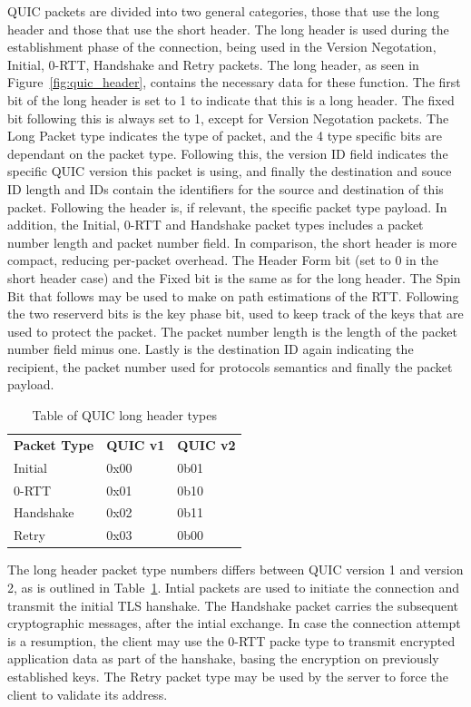 \documentclass[english, 12pt, a4paper, elec, utf8, a-2b, online]{aaltothesis}
\begin{document}
QUIC packets are divided into two general categories, those that use the long header
and those that use the short header. The long header is used during the establishment
phase of the connection, being used in the Version Negotation, Initial, 0-RTT, Handshake
and Retry packets. The long header, as seen in Figure~\ref{fig:quic_header}, contains the
necessary data for these function. The first bit of the long header is set to 1 to indicate
that this is a long header. The fixed bit following this is always set to 1, except
for Version Negotation packets. The Long Packet type indicates the type of packet,
and the 4 type specific bits are dependant on the packet type. Following this,
the version ID field indicates the specific QUIC version this packet is using, and
finally the destination and souce ID length and IDs contain the identifiers for
the source and destination of this packet. Following the header is, if relevant,
the specific packet type payload. In addition, the Initial, 0-RTT and Handshake
packet types includes a packet number length and packet number field. In comparison,
the short header is more compact, reducing per-packet overhead. The Header Form bit
(set to 0 in the short header case) and the Fixed bit is the same as for the long
header. The Spin Bit that follows may be used to make on path estimations of
the RTT. Following the two reserverd bits is the key phase bit, used to keep
track of the keys that are used to protect the packet. The packet number length
is the length of the packet number field minus one. Lastly is the destination ID
again indicating the recipient, the packet number used for protocols semantics
and finally the packet payload\cite{rfc9000}.

\begin{table}[tb]
	\centering
	\caption{Table of QUIC long header types}
	\label{tab:quic_long_header_types}
	\begin{tabular}{lll}
	\textbf{Packet Type}		  & \textbf{QUIC v1} & \textbf{QUIC v2} \\
	Initial   & 0x00    & 0b01    \\
	0-RTT     & 0x01    & 0b10    \\
	Handshake & 0x02    & 0b11    \\
	Retry     & 0x03    & 0b00   
	\end{tabular}
\end{table}
The long header packet type numbers differs between QUIC version 1 and version 2, as
is outlined in Table~\ref{tab:quic_long_header_types}. Intial packets are used to initiate the connection and transmit
the initial TLS hanshake. The Handshake packet carries the subsequent
cryptographic messages, after the intial exchange. In case the connection attempt is
a resumption, the client may use the 0-RTT packe type to transmit encrypted application
data as part of the hanshake, basing the encryption on previously established keys. The
Retry packet type may be used by the server to force the client to
validate its address\cite{rfc9000}.
\end{document}
